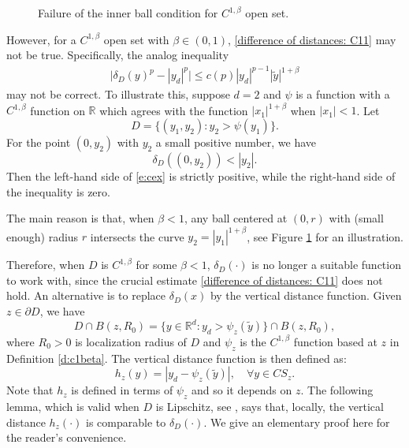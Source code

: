 \documentclass[12pt,a4paper]{amsart}
\numberwithin{equation}{section}
\theoremstyle{plain}
\newcommand{\R}{\mathbb{R}}
\newcommand{\1}{\mathbbm{1}}
\begin{document}
\begin{center}
\begin{figure}[H] 
    \centering
    \caption{Failure of the inner ball condition for $C^{1,\beta}$ open set.}
    \label{figure:inner ball}
\end{figure}
\end{center}
However, for a $C^{1,\beta}$ open set with $\beta \in (0,1)$, \eqref{difference of distances: C11} 
may not be true. Specifically, the analog inequality 
\begin{align}\label{e:cex}
\big| \delta_D(y)^p - |y_d|^p \big| \le c(p) |y_d|^{p-1}|\widetilde{y}|^{1+\beta}
\end{align}
may not be correct. 
To illustrate this, suppose $d=2$ and $\psi$ is a function with a $C^{1, \beta}$ function on $\R$ which agrees with
the function $|x_1|^{1+\beta}$ when $|x_1|<1$. Let 
\[
D = \{(y_1, y_2) : y_2 > \psi(y_1)\}.
\]
For the point $(0, y_2)$ with $y_2$ a small positive number, we have
\begin{equation}\label{ineqn:C1beta vs C11}
    \delta_D((0, y_2)) < |y_2|.
\end{equation}
Then the left-hand side of \eqref{e:cex} is strictly positive, while the right-hand side of the inequality is zero.

The main reason is that, when $\beta < 1$, any ball centered at $(0, r)$ with (small enough) radius $r$ intersects the curve $y_2 = |y_1|^{1+\beta}$, see Figure \ref{figure:inner ball} for an illustration. 


Therefore, when $D$ is $C^{1,\beta}$ for some $\beta < 1$, $\delta_D(\cdot)$ is no longer a suitable function to work with, since the crucial estimate \eqref{difference of distances: C11} does not hold. An alternative is to replace 
$\delta_D(x)$ by the vertical distance function.
Given $z \in \partial D$, we have
\[
D \cap B(z, R_0) = \{y \in \mathbb{R}^d : y_d > \psi_z(\widetilde{y})\} \cap B(z, R_0),
\]
where $R_0>0$ is localization radius of $D$ and $\psi_z$ is the $C^{1, \beta}$ function based at $z$ in Definition \ref{d:c1beta}.
The vertical distance function is then defined as:
\begin{equation}\label{distance-fcn-new: codimension 1}
    h_z(y) = |y_d - \psi_z(\widetilde{y})|, \quad \forall y \in CS_z.
\end{equation}
Note that $h_z$ is 
defined in terms of  $\psi_z$ and so it depends on $z$. 
The following lemma, which is valid when $D$ is Lipschitz, see \cite{Ancona78, Guan07}, says that, locally, the vertical distance $h_z(\cdot)$ is comparable to $\delta_D(\cdot)$. We give an elementary proof here for the reader's convenience.  
 
\end{document}
